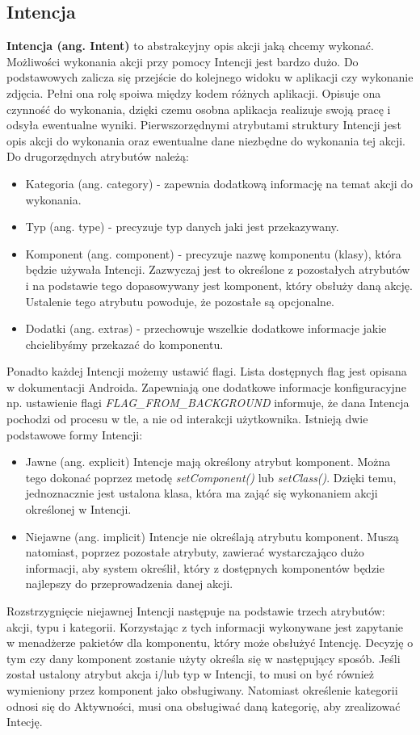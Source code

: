 \documentclass{article}
\numberwithin{equation}{section}
\begin{document}
\subsection{Intencja}
\textbf{Intencja (ang. Intent)} to abstrakcyjny opis akcji jaką chcemy wykonać. Możliwości wykonania akcji przy pomocy Intencji jest bardzo dużo. Do podstawowych zalicza się przejście do kolejnego widoku w aplikacji czy wykonanie zdjęcia. Pełni ona rolę spoiwa między kodem różnych aplikacji. Opisuje ona czynność do wykonania, dzięki czemu osobna aplikacja realizuje swoją pracę i odsyła ewentualne wyniki. Pierwszorzędnymi atrybutami struktury Intencji jest opis akcji do wykonania oraz ewentualne dane niezbędne do wykonania tej akcji. Do drugorzędnych atrybutów należą:
\begin{itemize}
\item Kategoria (ang. category) - zapewnia dodatkową informację na temat akcji do wykonania.
\item Typ (ang. type) - precyzuje typ danych jaki jest przekazywany.
\item Komponent (ang. component) - precyzuje nazwę komponentu (klasy), która będzie używała Intencji. Zazwyczaj jest to określone z pozostałych atrybutów i na podstawie tego dopasowywany jest komponent, który obsłuży daną akcję. Ustalenie tego atrybutu powoduje, że pozostałe są opcjonalne.
\item Dodatki (ang. extras) - przechowuje wszelkie dodatkowe informacje jakie chcielibyśmy przekazać do komponentu.
\end{itemize}
Ponadto każdej Intencji możemy ustawić flagi. Lista dostępnych flag jest opisana w dokumentacji Androida. Zapewniają one dodatkowe informacje konfiguracyjne np. ustawienie flagi \textit{FLAG\_FROM\_BACKGROUND} informuje, że dana Intencja pochodzi od procesu w tle, a nie od interakcji użytkownika.
Istnieją dwie podstawowe formy Intencji:
\begin{itemize}
    \item Jawne (ang. explicit) Intencje mają określony atrybut komponent. Można tego dokonać poprzez metodę \textit{setComponent()} lub \textit{setClass()}. Dzięki temu, jednoznacznie jest ustalona klasa, która ma zająć się wykonaniem akcji określonej w Intencji.
    \item Niejawne (ang. implicit) Intencje nie określają atrybutu komponent. Muszą natomiast, poprzez pozostałe atrybuty, zawierać wystarczająco dużo informacji, aby system określił, który z dostępnych komponentów będzie najlepszy do przeprowadzenia danej akcji.
\end{itemize}
Rozstrzygnięcie niejawnej Intencji następuje na podstawie trzech atrybutów: akcji, typu i kategorii. Korzystając z tych informacji wykonywane jest zapytanie w menadżerze pakietów dla komponentu, który może obsłużyć Intencję. Decyzję o tym czy dany komponent zostanie użyty określa się w następujący sposób. Jeśli został ustalony atrybut akcja i/lub typ w Intencji, to musi on być również wymieniony przez komponent jako obsługiwany.  Natomiast określenie kategorii odnosi się do Aktywności, musi ona obsługiwać daną kategorię, aby zrealizować Intecję.\citep{intent}
\end{document}
